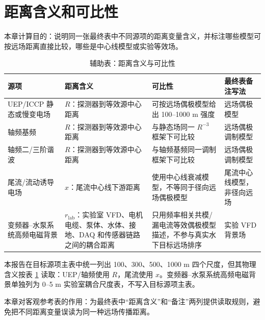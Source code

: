 \section{距离含义和可比性}

本章计算目的：说明同一张最终表中不同源项的距离变量含义，并标注哪些模型可按远场距离直接比较，哪些是中心线模型或实验等效场。

\begin{table}[H]
\centering
\caption{辅助表：距离含义与可比性}
\label{tab:distance-meaning}
\small
\begin{tabular}{p{3.5cm}p{4.2cm}p{4.0cm}p{3.0cm}}
\toprule
源项 & 距离含义 & 可比性 & 最终表备注写法\\
\midrule
UEP/ICCP 静态或慢变电场 & $R$：探测器到等效源中心距离 & 可按远场偶极模型给出 100--1000 m 强度 & 远场偶极模型\\
轴频基频 & $R$：探测器到等效源中心距离 & 与静态场同一 $R^{-3}$ 框架下可比较 & 远场偶极调制模型\\
轴频二/三阶谐波 & $R$：探测器到等效源中心距离 & 与轴频基频同一调制框架下可比较 & 远场偶极调制模型\\
尾流/流动诱导电场 & $x$：尾流中心线下游距离 & 使用中心线衰减模型，不等同于径向远场偶极模型 & 尾流中心线模型，非径向远场\\
变频器--水泵系统高频电磁背景 & $r_{\mathrm{lab}}$：实验室 VFD、电机电缆、泵体、水体、接地、DAQ 和传感器链路之间的耦合距离 & 只用频率相关共模/漏电流等效偶极模型描述，不参与真实水下目标远场排序 & 实验 VFD 背景场\\
\bottomrule
\end{tabular}
\end{table}

本报告在目标源项主表中统一列出 100、300、500、1000 m 四个尺度，但其物理含义按表 \ref{tab:distance-meaning} 读取：UEP/轴频使用 $R$，尾流使用 $x$。变频器--水泵系统高频电磁背景单独列为 0--5 m 实验室耦合尺度表，不写入目标源项主表。

本章对客观参考表的作用：为最终表中“距离含义”和“备注”两列提供读取规则，避免把不同距离变量误读为同一种远场传播距离。
